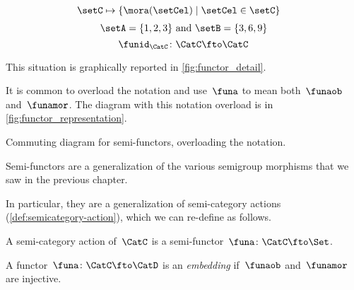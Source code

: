 {\begin{forslides}
\begin{equation}
\begin{aligned}
                \setC                                  & \mapsto \{ \mora(\setCel) \mid \setCel \in \setC\} 
            \end{aligned}
        \end{equation}
        \begin{equation}
            \label{eq:pow_fun_4}
            \setA=\{ 1,2,3\} \text{ and }\setB=\{3,6,9\}
        \end{equation}
        \begin{equation}
            \label{eq:idfun}
            \funid_\CatC \colon \CatC \fto \CatC
        \end{equation}
    \end{forslides}
}

This situation is graphically reported in \cref{fig:functor_detail}.

It is common to overload the notation and use~$\funa$ to mean both~$\funaob$ and~$\funamor$.
The diagram with this notation overload is in \cref{fig:functor_representation}.

\begin{marginfigure}
    \centering
    \caption{Commuting diagram for semi-functors, overloading the notation.}
    \label{fig:functor_representation}
\end{marginfigure}


Semi-functors are a generalization of the various semigroup morphisms that we saw in the previous chapter.


In particular, they are a generalization of semi-category actions (\cref{def:semicategory-action}), which we can re-define as follows.

\begin{ctdefinition}
    A semi-category action of~$\CatC$ is a semi-functor~$\funa\colon \CatC \fto \Set$.
\end{ctdefinition}

\begin{ctdefinition}
    \label{def:embedding-functor}
    A functor~$\funa\colon \CatC \fto \CatD$ is an \emph{embedding} if~$\funaob$ and~$\funamor$ are injective.
\end{ctdefinition}

